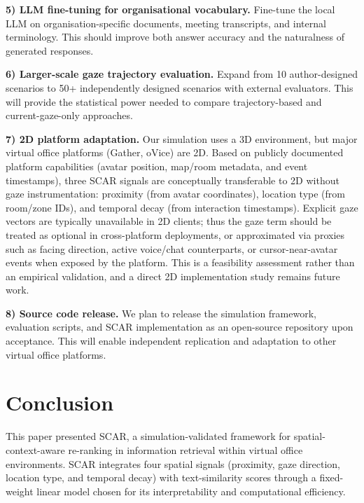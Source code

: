 \documentclass[journal]{IEEEtran}
\begin{document}
\textbf{5) LLM fine-tuning for organisational vocabulary.}
Fine-tune the local LLM on organisation-specific documents, meeting transcripts, and internal terminology.
This should improve both answer accuracy and the naturalness of generated responses.

\textbf{6) Larger-scale gaze trajectory evaluation.}
Expand from 10 author-designed scenarios to 50+ independently designed scenarios with external evaluators.
This will provide the statistical power needed to compare trajectory-based and current-gaze-only approaches.

\textbf{7) 2D platform adaptation.}
Our simulation uses a 3D environment, but major virtual office platforms (Gather, oVice) are 2D.  Based on publicly documented platform capabilities (avatar position, map/room metadata, and event timestamps), three SCAR signals are conceptually transferable to 2D without gaze instrumentation: proximity (from avatar coordinates), location type (from room/zone IDs), and temporal decay (from interaction timestamps). Explicit gaze vectors are typically unavailable in 2D clients; thus the gaze term should be treated as optional in cross-platform deployments, or approximated via proxies such as facing direction, active voice/chat counterparts, or cursor-near-avatar events when exposed by the platform.  This is a feasibility assessment rather than an empirical validation, and a direct 2D implementation study remains future work.

\textbf{8) Source code release.}
We plan to release the simulation framework, evaluation scripts, and SCAR implementation as an open-source repository upon acceptance.  This will enable independent replication and adaptation to other virtual office platforms.

\section{Conclusion}
\label{sec:conclusion}

This paper presented SCAR, a simulation-validated framework for spatial-context-aware re-ranking in information retrieval within virtual office environments.
SCAR integrates four spatial signals (proximity, gaze direction, location type, and temporal decay) with text-similarity scores through a fixed-weight linear model chosen for its interpretability and computational efficiency.
\end{document}
